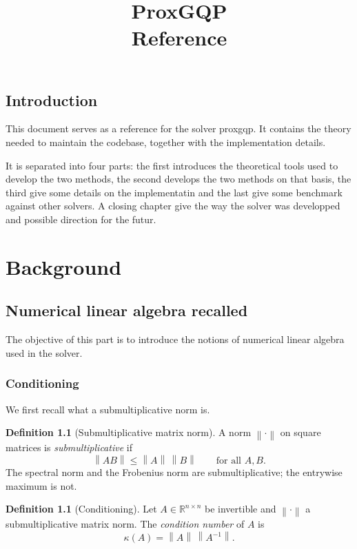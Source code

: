 \documentclass[a4paper,11pt]{book}
\title{\bfseries ProxGQP\\[3mm]\large Reference}
\author{}
\date{}
\theoremstyle{plain}
\theoremstyle{definition}
\newtheorem{definition}[theorem]{Definition}
\theoremstyle{remark}
\numberwithin{equation}{chapter}
\numberwithin{algorithm}{chapter}
\newcommand{\R}{\mathbb{R}}
\newcommand{\norm}[1]{\left\|#1\right\|}
\begin{document}
	\maketitle
	\tableofcontents
	
	\chapter{Introduction}
	
	This document serves as a reference for the solver proxgqp. It contains the
	theory needed to maintain the codebase, together with the implementation
	details.
	
	It is separated into four parts: the first introduces the theoretical tools
	used to develop the two methods, the second develops the two methods on that
	basis, the third give some details on the implementatin and the last give some benchmark against other solvers. A closing chapter give the way the solver was developped and possible direction for the futur. 
	
	
	\part{Background}
	
	\chapter{Numerical linear algebra recalled}
	
	The objective of this part is to introduce the notions of numerical linear
	algebra used in the solver.
	\section{Conditioning}
	
	We first recall what a submultiplicative norm is.
	
	\begin{definition}[Submultiplicative matrix norm]
		A norm $\norm{\cdot}$ on square matrices is \emph{submultiplicative} if
		\begin{equation}
			\norm{AB}\leq\norm{A}\,\norm{B}
			\qquad\text{for all }A,B .
		\end{equation}
		The spectral norm and the Frobenius norm are submultiplicative; the entrywise
		maximum is not.
	\end{definition}
	
	\begin{definition}[Conditioning]
		Let $A\in\R^{n\times n}$ be invertible and $\norm{\cdot}$ a submultiplicative
		matrix norm. The \emph{condition number} of $A$ is
		\begin{equation}
			\kappa(A)=\norm{A}\,\norm{A^{-1}} .
		\end{equation}
	\end{definition}
	
\end{document}
